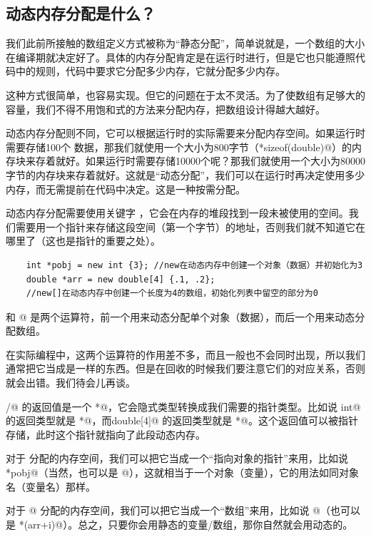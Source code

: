 \subsection*{动态内存分配是什么？}
我们此前所接触的数组定义方式被称为``静态分配''，简单说就是，一个数组的大小在编译期就决定好了。具体的内存分配肯定是在运行时进行，但是它也只能遵照代码中的规则，代码中要求它分配多少内存，它就分配多少内存。\par
这种方式很简单，也容易实现。但它的问题在于太不灵活。为了使数组有足够大的容量，我们不得不用饱和式的方法来分配内存，把数组设计得越大越好。\par
动态内存分配则不同，它可以根据运行时的实际需要来分配内存空间。如果运行时需要存储100个 \lstinline@double@ 数据，那我们就使用一个大小为800字节（*sizeof(double)@）的内存块来存着就好。如果运行时需要存储10000个呢？那我们就使用一个大小为80000字节的内存块来存着就好。这就是``动态分配''，我们可以在运行时再决定使用多少内存，而无需提前在代码中决定。这是一种按需分配。\par
动态内存分配需要使用关键字 \lstinline@new@，它会在内存的堆段找到一段未被使用的空间。我们需要用一个指针来存储这段空间（第一个字节）的地址，否则我们就不知道它在哪里了（这也是指针的重要之处）。
\begin{lstlisting}
    int *pobj = new int {3}; //new在动态内存中创建一个对象（数据）并初始化为3
    double *arr = new double[4] {.1, .2};
    //new[]在动态内存中创建一个长度为4的数组，初始化列表中留空的部分为0
\end{lstlisting}
\lstinline@new@ 和 \lstinline@new[]@ 是两个运算符，前一个用来动态分配单个对象（数据），而后一个用来动态分配数组。\par
在实际编程中，这两个运算符的作用差不多，而且一般也不会同时出现，所以我们通常把它当成是一样的东西。但是在回收的时候我们要注意它们的对应关系，否则就会出错。我们待会儿再谈。\par
\lstinline@new@/\lstinline@new[]@ 的返回值是一个 \lstinline@void*@，它会隐式类型转换成我们需要的指针类型。比如说 \lstinline@new int@ 的返回类型就是 \lstinline@int*@，而\lstinline@new double[4]@ 的返回类型就是 \lstinline@double*@。这个返回值可以被指针存储，此时这个指针就指向了此段动态内存。\par
对于 \lstinline@new@ 分配的内存空间，我们可以把它当成一个``指向对象的指针''来用，比如说 \lstinline@*pobj@（当然，也可以是 \lstinline@pobj[0]@），这就相当于一个对象（变量），它的用法如同对象名（变量名）那样。\par
对于 \lstinline@new[]@ 分配的内存空间，我们可以把它当成一个``数组''来用，比如说 \lstinline@arr[i]@（也可以是 \lstinline@*(arr+i)@）。总之，只要你会用静态的变量/数组，那你自然就会用动态的。\par
